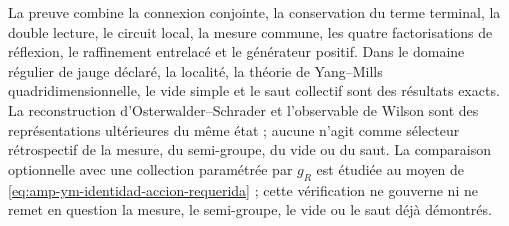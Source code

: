 La preuve combine la connexion conjointe, la conservation du terme terminal, la double lecture, le circuit local, la mesure commune, les quatre factorisations de réflexion, le raffinement entrelacé et le générateur positif. Dans le domaine régulier de jauge déclaré, la localité, la théorie de Yang--Mills quadridimensionnelle, le vide simple et le saut collectif sont des résultats exacts. La reconstruction d'Osterwalder--Schrader et l'observable de Wilson sont des représentations ultérieures du même état ; aucune n'agit comme sélecteur rétrospectif de la mesure, du semi-groupe, du vide ou du saut. La comparaison optionnelle avec une collection paramétrée par \(g_R\) est étudiée au moyen de \eqref{eq:amp-ym-identidad-accion-requerida} ; cette vérification ne gouverne ni ne remet en question la mesure, le semi-groupe, le vide ou le saut déjà démontrés.
